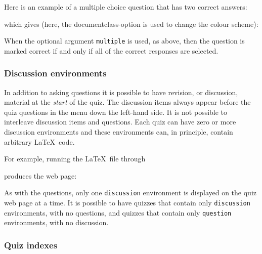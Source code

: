 \documentclass[svgnames]{article}
\begin{document}

Here is an example of a multiple choice question that has
two correct answers:

  
  \label{choice-multiple}

  \noindent which gives (here, the documentclass-option
   is used to change the colour scheme):


When the optional argument \Verb|multiple| is used, as above, then the
question is marked correct if and only if all of the correct responses
are selected.

  \subsubsection{Discussion environments}

In addition to asking questions it is possible to have revision, or
discussion, material at the \textit{start} of the quiz.  The discussion
items always appear before the quiz questions in the menu down the
left-hand side. It is not possible to interleave discussion items and
questions. Each quiz can have zero or more discussion environments and
these environments can, in principle, contain arbitrary \LaTeX\ code.

For example, running the \LaTeX\ file through \WebQuiz

  

produces the web page:


As with the questions, only one \Verb|discussion| environment is
displayed on the quiz web page at a time. It is possible to have quizzes
that contain only \Verb|discussion| environments, with no questions, and
quizzes that contain only \Verb|question| environments, with no
discussion.

  \subsubsection{Quiz indexes}

\end{document}
